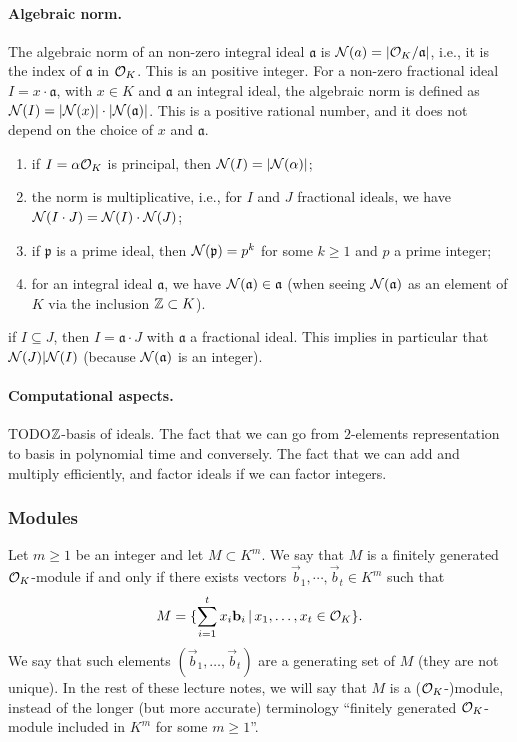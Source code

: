 \paragraph{Algebraic norm.} The algebraic norm of an non-zero integral ideal $\mathfrak{a}$ is $\mathcal{N}(a) = |\mathcal{O}_K/\mathfrak{a}|$, i.e., it is the index of $\mathfrak{a}$ in $\mathcal{O}_K$. This is an positive integer. For a non-zero fractional ideal $I = x \cdot \mathfrak{a}$, with $x \in K$ and $\mathfrak{a}$ an integral ideal, the algebraic norm is defined as $\mathcal{N}(I) = |\mathcal{N}(x)| \cdot |\mathcal{N}(\mathfrak{a})|$. This is a positive rational number, and it does not depend on the choice of $x$ and $\mathfrak{a}$.

\begin{properties}
\label{prop:norm-ideal}
\begin{enumerate}
\item if $I = \alpha \mathcal{O}_K$ is principal, then $\mathcal{N}(I) = |\mathcal{N}(\alpha)|$;
\item the norm is multiplicative, i.e., for $I$ and $J$ fractional ideals, we have $\mathcal{N}(I \cdot J) = \mathcal{N}(I) \cdot \mathcal{N}(J)$;
\item if $\mathfrak{p}$ is a prime ideal, then $\mathcal{N}(\mathfrak{p}) = p^k$ for some $k \geq 1$ and $p$ a prime integer;
\item for an integral ideal $\mathfrak{a}$, we have $\mathcal{N}(\mathfrak{a}) \in \mathfrak{a}$ (when seeing $\mathcal{N}(\mathfrak{a})$ as an element of $K$ via the inclusion $\mathbb{Z} \subset K$).
\end{enumerate}
\item if $I \subseteq J$, then $I = \mathfrak{a} \cdot J$ with $\mathfrak{a}$ a fractional ideal. This implies in particular that $\mathcal{N}(J) |\mathcal{N}(I)$ (because $\mathcal{N}(\mathfrak{a})$ is an integer).
\end{properties}


\paragraph{Computational aspects.} {\color{red} TODO}$\mathbb{Z}$-basis of ideals. The fact that we can go from $2$-elements representation to basis in polynomial time and conversely. The fact that we can add and multiply efficiently, and factor ideals if we can factor integers.

\subsubsection{Modules}
\label{sec:modules}
Let $m \geq 1$ be an integer and let $M \subset K^m$. We say that $M$ is a finitely generated $\mathcal{O}_K$-module if and only if there exists vectors $\vec b_1, \cdots, \vec b_t \in K^m$ such that
\[ M = \{ \sum_{i = 1}^t x_i \mathbf b_i \,|\, x_1, \dots, x_t \in \mathcal{O}_K\}. \]
We say that such elements $(\vec b_1, \dots, \vec b_t)$ are a generating set of $M$ (they are not unique).
In the rest of these lecture notes, we will say that $M$ is a ($\mathcal{O}_K$-)module, instead of the longer (but more accurate) terminology ``finitely generated $\mathcal{O}_K$-module included in $K^m$ for some $m \geq 1$''.

